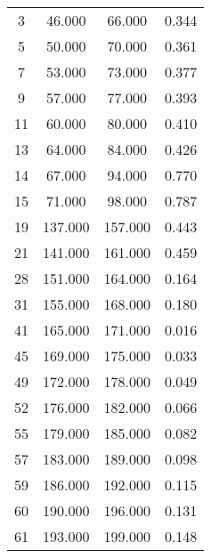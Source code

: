 % 
\begin{tabular}{cccc}
  \hline
  \hline
3 & 46.000 & 66.000 & 0.344 \\ 
  5 & 50.000 & 70.000 & 0.361 \\ 
  7 & 53.000 & 73.000 & 0.377 \\ 
  9 & 57.000 & 77.000 & 0.393 \\ 
  11 & 60.000 & 80.000 & 0.410 \\ 
  13 & 64.000 & 84.000 & 0.426 \\ 
  14 & 67.000 & 94.000 & 0.770 \\ 
  15 & 71.000 & 98.000 & 0.787 \\ 
  19 & 137.000 & 157.000 & 0.443 \\ 
  21 & 141.000 & 161.000 & 0.459 \\ 
  28 & 151.000 & 164.000 & 0.164 \\ 
  31 & 155.000 & 168.000 & 0.180 \\ 
  41 & 165.000 & 171.000 & 0.016 \\ 
  45 & 169.000 & 175.000 & 0.033 \\ 
  49 & 172.000 & 178.000 & 0.049 \\ 
  52 & 176.000 & 182.000 & 0.066 \\ 
  55 & 179.000 & 185.000 & 0.082 \\ 
  57 & 183.000 & 189.000 & 0.098 \\ 
  59 & 186.000 & 192.000 & 0.115 \\ 
  60 & 190.000 & 196.000 & 0.131 \\ 
  61 & 193.000 & 199.000 & 0.148 \\ 
   \hline
\end{tabular}
